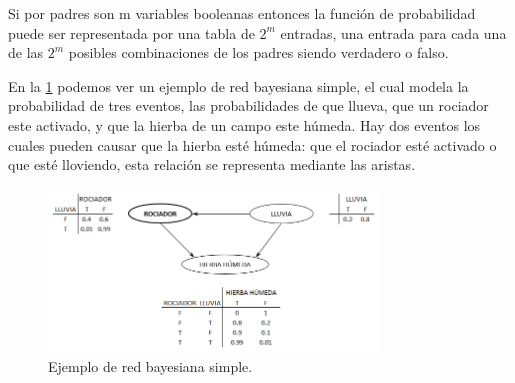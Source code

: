 Si por padres son m variables booleanas entonces la función de probabilidad puede ser representada por una tabla de $2^m$ entradas, una entrada para cada una de las $2^m$ posibles combinaciones de los padres siendo verdadero o falso.

En la \ref{fig:redBayesianaEjemplo} podemos ver un ejemplo de red bayesiana simple, el cual modela la probabilidad de tres eventos, las probabilidades de que llueva, que un rociador este activado, y que la hierba de un campo este húmeda. Hay dos eventos los cuales pueden causar que la hierba esté húmeda: que el rociador esté activado o que esté lloviendo, esta relación se representa mediante las aristas.

\begin{figure}[h!]
	\centering
	\includegraphics[width=8.75cm]{img/redBayesianaEjemplo.png}
	\caption{Ejemplo de red bayesiana simple.}
	\label{fig:redBayesianaEjemplo}
\end{figure}